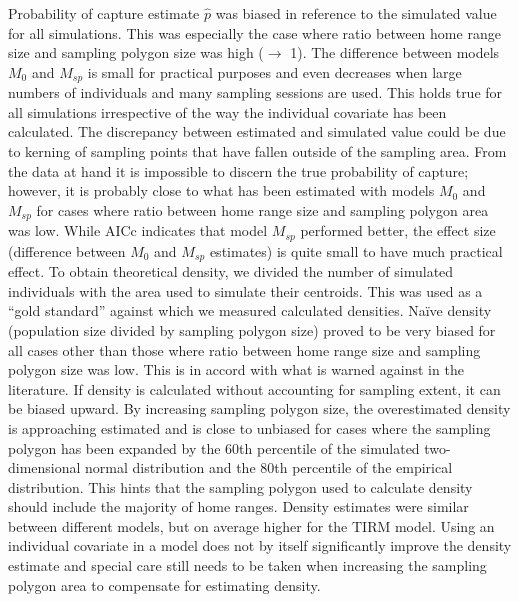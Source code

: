 Probability of capture estimate $\hat{p}$ was biased in reference to the simulated value for all simulations. This was especially the case where ratio between home range size and sampling polygon size was high ($\rightarrow$ 1). The difference between models $M_0$ and $M_{sp}$ is small for practical purposes and even decreases when large numbers of individuals and many sampling sessions are used. This holds true for all simulations irrespective of the way the individual covariate has been calculated. The discrepancy between estimated and simulated value could be due to kerning of sampling points that have fallen outside of the sampling area. From the data at hand it is impossible to discern the true probability of capture; however, it is probably close to what has been estimated with models $M_0$ and $M_{sp}$ for cases where ratio between home range size and sampling polygon area was low. While AICc indicates that model $M_{sp}$ performed better, the effect size (difference between $M_0$ and $M_{sp}$ estimates) is quite small to have much practical effect.
To obtain theoretical density, we divided the number of simulated individuals with the area used to simulate their centroids. This was used as a ``gold standard'' against which we measured calculated densities. Naïve density (population size divided by sampling polygon size) proved to be very biased for all cases other than those where ratio between home range size and sampling polygon size was low. This is in accord with what is warned against in the literature. If density is calculated without accounting for sampling extent, it can be biased upward. By increasing sampling polygon size, the overestimated density is approaching estimated and is close to unbiased for cases where the sampling polygon has been expanded by the 60th percentile of the simulated two-dimensional normal distribution and the 80th percentile of the empirical distribution. This hints that the sampling polygon used to calculate density should include the majority of home ranges. Density estimates were similar between different models, but on average higher for the TIRM model. Using an individual covariate in a model does not by itself significantly improve the density estimate and special care still needs to be taken when increasing the sampling polygon area to compensate for estimating density.
